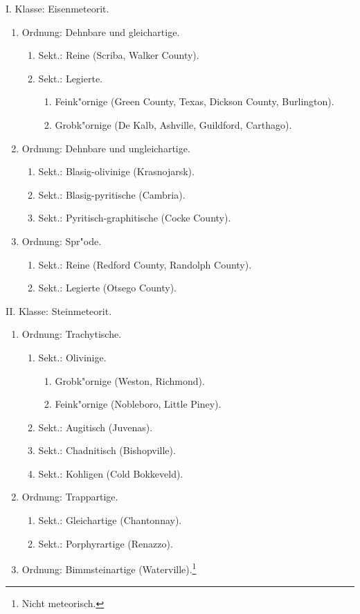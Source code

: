 \documentclass[a4paper, 11pt, oneside, german]{article}
\begin{document}
\begin{center}
I. Klasse: Eisenmeteorit.
\end{center}
\begin{enumerate}
  \item Ordnung: Dehnbare und gleichartige.
  \begin{enumerate}
    \item Sekt.: Reine (Scriba, Walker County).
    \item Sekt.: Legierte.
    \begin{enumerate}
      \item Feink"ornige (Green County, Texas, Dickson County, Burlington).
      \item Grobk"ornige (De Kalb, Ashville, Guildford, Carthago).
    \end{enumerate}
  \end{enumerate}
  \item Ordnung: Dehnbare und ungleichartige.
  \begin{enumerate}
    \item Sekt.: Blasig-olivinige (Krasnojarsk).
    \item Sekt.: Blasig-pyritische (Cambria).
    \item Sekt.: Pyritisch-graphitische (Cocke County).
  \end{enumerate}
  \item Ordnung: Spr"ode.
  \begin{enumerate}
    \item Sekt.: Reine (Redford County, Randolph County).
    \item Sekt.: Legierte (Otsego County).
  \end{enumerate}
\end{enumerate}

\begin{center}
II. Klasse: Steinmeteorit.
\end{center}
\begin{enumerate}
  \item Ordnung: Trachytische.
  \begin{enumerate}
    \item Sekt.: Olivinige.
    \begin{enumerate}
      \item Grobk"ornige (Weston, Richmond).
      \item Feink"ornige (Nobleboro, Little Piney).
    \end{enumerate}
    \item Sekt.: Augitisch (Juvenas).
    \item Sekt.: Chadnitisch (Bishopville).
    \item Sekt.: Kohligen (Cold Bokkeveld).
  \end{enumerate}
  \item Ordnung: Trappartige.
  \begin{enumerate}
    \item Sekt.: Gleichartige (Chantonnay).
    \item Sekt.: Porphyrartige (Renazzo).
  \end{enumerate}
  \item Ordnung: Bimmsteinartige (Waterville).\footnote{Nicht meteorisch.}
\end{enumerate}
\end{document}
